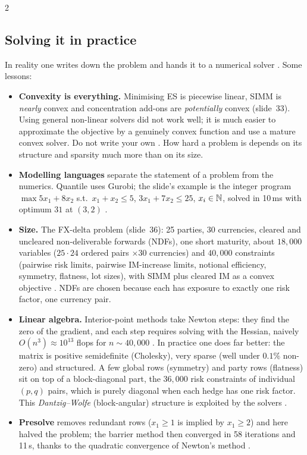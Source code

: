 \begin{paracol}{2}
\subsection{Solving it in practice}
In reality one writes down the problem and hands it to a numerical solver . Some lessons:
\begin{itemize}
  \item \textbf{Convexity is everything.} Minimising ES is piecewise linear, SIMM is \emph{nearly} convex and
        concentration add-ons are \emph{potentially} convex (slide~33). Using general non-linear solvers did not
        work well; it is much easier to approximate the objective by a genuinely convex function and use a mature
        convex solver. Do not write your own . How hard a problem is depends on its structure
        and sparsity much more than on its size.
  \item \textbf{Modelling languages} separate the statement of a problem from the numerics. Quantile uses Gurobi;
        the slide's example is the integer program $\max 5x_1+8x_2$ s.t.\ $x_1+x_2\le5$, $3x_1+7x_2\le25$,
        $x_i\in\mathbb{N}$, solved in 10\,ms with optimum $31$ at $(3,2)$ .
  \item \textbf{Size.} The FX-delta problem (slide~36): 25 parties, 30 currencies, cleared and uncleared
        non-deliverable forwards (NDFs), one short maturity, about $18{,}000$ variables ($25\cdot24$ ordered pairs
        $\times30$ currencies) and $40{,}000$ constraints (pairwise risk limits, pairwise IM-increase limits, notional
        efficiency, symmetry, flatness, lot sizes), with SIMM plus cleared IM as a convex objective
        . NDFs are chosen because each has exposure to exactly one risk factor, one currency pair.
  \item \textbf{Linear algebra.} Interior-point methods take Newton steps: they find the zero of the gradient, and
        each step requires solving with the Hessian, naively $O(n^3)\approx10^{13}$ flops for $n\sim40{,}000$
        . In practice one does far better: the matrix is positive semidefinite (Cholesky), very
        sparse (well under $0.1\%$ non-zero) and structured. A few global rows (symmetry) and party rows (flatness)
        sit on top of a block-diagonal part, the $36{,}000$ risk constraints of individual $(p,q)$ pairs, which is
        purely diagonal when each hedge has one risk factor. This \emph{Dantzig--Wolfe} (block-angular) structure
        is exploited by the solvers .
  \item \textbf{Presolve} removes redundant rows ($x_1\ge1$ is implied by $x_1\ge2$) and here halved the problem;
        the barrier method then converged in 58 iterations and 11\,s, thanks to the quadratic convergence of Newton's
        method .
\end{itemize}


\end{paracol}
